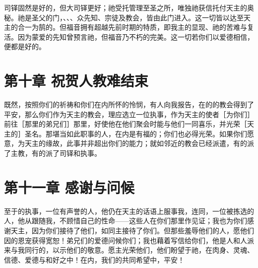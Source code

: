 司铎固然是好的，但大司铎更好；祂受托管理至圣之所，唯独祂获信托付天主的奥秘。祂是圣父的门，、、、众先知、宗徒及教会，皆由此门进入。这一切皆以达至天主的合一为鹄的。但福音拥有超越先前时期的特质，即我主的显现、祂的苦难与复活。因为蒙爱的先知曾预言祂，但福音乃不朽的完美。这一切若你们以爱德相信，便都是好的。\par


\section{第十章 祝贺人教难结束}

既然，按照你们的祈祷和你们在内所怀的怜悯，有人向我报告，在的的教会得到了平安，那么你们作为天主的教会，理应选立一位执事，作为天主的使者［为你们］前往［那里的弟兄们］那里，好使他在他们聚会时能与他们一同喜乐，并光荣［天主的］圣名。那堪当如此职事的人，在内是有福的；你们也必得光荣。如果你们愿意，为天主的缘故，此事并非超出你们的能力；就如邻近的教会已经派遣，有的派了主教，有的派了司铎和执事。\par


\section{第十一章 感谢与问候}

至于的执事，一位有声誉的人，他仍在天主的话语上服事我，连同，一位被拣选的人，他从跟随我，不顾惜自己的性命——这些人在你们那里作见证；我也为你们感谢天主，因为你们接待了他们，如同主接待了你们。但那些羞辱他们的人，愿他们因的恩宠获得宽恕！弟兄们的爱德问候你们；我也藉着写信给你们，他是人和人派来与我同行的，以示他们的敬意。愿主光荣他们，他们盼望于祂，在肉身、灵魂、信德、爱德与和好之中！在内，我们的共同希望中，平安！\par

